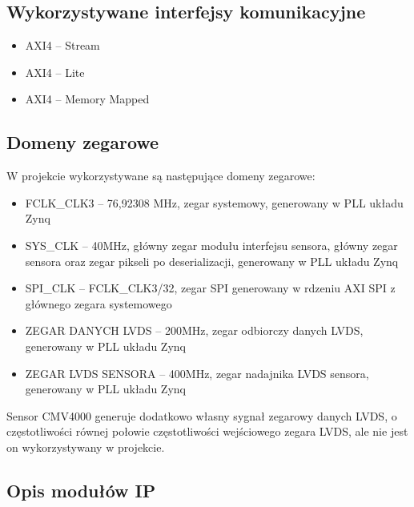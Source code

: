 \documentclass[a4paper,11pt,oneside]{book}  %
\begin{document}
\subsection{Wykorzystywane interfejsy komunikacyjne}
\begin{itemize}
\item AXI4 – Stream 
\item AXI4 – Lite 
\item AXI4 – Memory Mapped
\end{itemize}


\subsection{Domeny zegarowe} 

W projekcie wykorzystywane są następujące domeny zegarowe:
\begin{itemize}
\item FCLK\_CLK3 – 76,92308 MHz, zegar systemowy, generowany w PLL układu Zynq
\item SYS\_CLK – 40MHz, główny zegar modułu interfejsu sensora, główny zegar sensora oraz zegar pikseli po deserializacji, generowany w PLL układu Zynq
\item SPI\_CLK – FCLK\_CLK3/32, zegar SPI generowany w rdzeniu AXI SPI z głównego zegara systemowego
\item ZEGAR DANYCH LVDS – 200MHz, zegar odbiorczy danych LVDS, generowany w PLL układu Zynq
\item ZEGAR LVDS SENSORA – 400MHz, zegar nadajnika LVDS sensora, generowany w PLL układu Zynq
\end{itemize}

Sensor CMV4000 generuje dodatkowo własny sygnał zegarowy danych LVDS, o częstotliwości równej połowie częstotliwości wejściowego zegara LVDS, ale nie jest on wykorzystywany w projekcie.

\subsection{Opis modułów IP}
\end{document}
